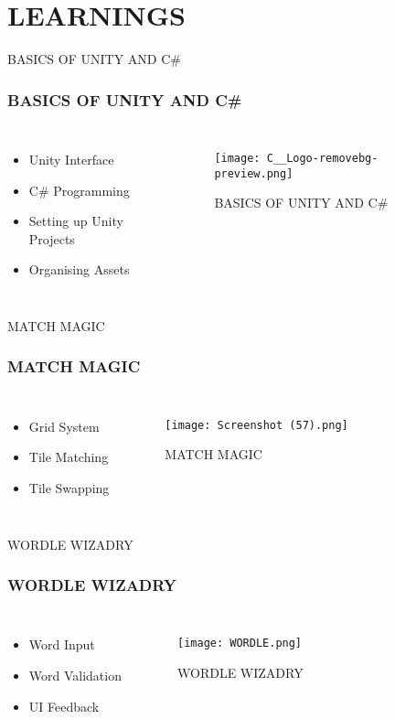 \documentclass[10pt]{beamer}
\begin{document}
\section{LEARNINGS}

\begin{frame}{BASICS OF UNITY AND C\#}
    \frametitle{BASICS OF UNITY AND C\#}
    \begin{columns}
    
    \begin{itemize}   
    
            \item Unity Interface
            \item C\# Programming
            \item Setting up Unity Projects
            \item Organising Assets

            \end{itemize}
        \begin{figure}
        \texttt{[image: C\_\_Logo-removebg-preview.png]}
        \caption{BASICS OF UNITY AND C\#}
        \end{figure}
     \end{columns}
\end{frame}
\begin{frame}{MATCH MAGIC}
    \frametitle{MATCH MAGIC}
    \begin{columns}
    
    \begin{itemize}
    
    
            \item Grid System
            \item Tile Matching
            \item Tile Swapping

            \end{itemize}
        \begin{figure}
        \texttt{[image: Screenshot (57).png]}
        \caption{MATCH MAGIC}
        \end{figure}
     \end{columns}
\end{frame}
\begin{frame}{WORDLE WIZADRY}
    \frametitle{WORDLE WIZADRY}
    \begin{columns}
    
    \begin{itemize}
    
    
            \item Word Input
            \item Word Validation
            \item UI Feedback
            \end{itemize}
        \begin{figure}
        \texttt{[image: WORDLE.png]}
        \caption{WORDLE WIZADRY}
        \end{figure}
     \end{columns}
\end{frame}
\end{document}
